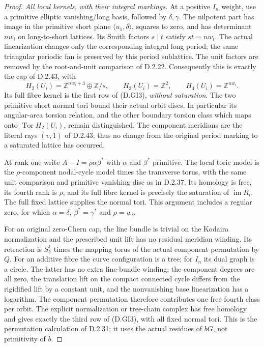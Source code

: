 \begin{proof}
\emph{All local kernels, with their integral markings.}
At a positive $I_n$ weight, use a primitive elliptic
vanishing/long basis, followed by $\delta,\gamma$.
The nilpotent part has image in the primitive short
plane $\langle u_1,\delta\rangle$, squares to zero,
and has determinant $nw_i$ on long-to-short lattices.
Its Smith factors $s\mid t$ satisfy $st=nw_i$.
The actual linearization changes only the corresponding
integral long period; the same triangular periodic fan
is preserved by this period sublattice. The unit factors
are removed by the root-and-unit comparison of D.2.22.
Consequently this is exactly the cap of D.2.43, with
\[
 H_2(U_i)=\mathbb Z^{nw_i+3}\oplus\mathbb Z/s,
 \qquad H_3(U_i)=\mathbb Z^2,\qquad
 H_4(U_i)=\mathbb Z^{nw_i}.
\]
Its full fibre kernel is the first row of (D.GI3),
\emph{without saturation}. The two primitive short
normal tori bound their actual orbit discs. In
particular its angular-area torsion relation, and
the other boundary torsion class which maps onto
$\operatorname{Tor}H_2(U_i)$, remain distinguished.
The component meridians are the literal rays $(v,1)$
of D.2.43; thus no change from the original period
marking to a saturated lattice has occurred.

At rank one write $A-I=\rho\alpha\beta^*$ with
$\alpha$ and $\beta^*$ primitive. The local toric
model is the $\rho$-component nodal-cycle model
times the transverse torus, with the same unit
comparison and primitive vanishing disc as in
D.2.37. Its homology is free, its fourth rank is
$\rho$, and its full fibre kernel is precisely
the saturation of $\operatorname{im}R_i$.
The full fixed lattice supplies the normal tori.
This argument includes a regular zero, for which
$\alpha=\delta$, $\beta^*=\gamma^*$ and $\rho=w_i$.

For an original zero-Chern cap, the line bundle is
trivial on the Kodaira normalization and the prescribed
unit lift has no residual meridian winding. Its
retraction is $S^1_\delta$ times the mapping torus
of the actual component permutation by $Q$.
For an additive fibre the curve configuration is
a tree; for $I_n$ its dual graph is a circle.
The latter has no extra line-bundle winding: the
component degrees are all zero, the translation
lift on the compact connected cycle differs from
the rigidified lift by a constant unit, and the
nonvanishing base linearization has a logarithm.
The component permutation therefore contributes
one free fourth class per orbit. The explicit
normalization or tree-chain complex has free
homology and gives exactly the third row of
(D.GI3), with all fixed normal tori. This is the
permutation calculation of D.2.31; it uses the
actual residues of $bG$, not primitivity of $b$.


\end{proof}
